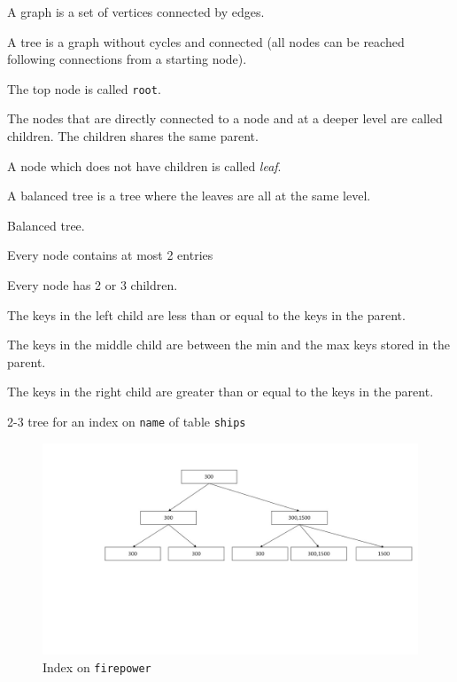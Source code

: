 \documentclass{beamer}
\begin{document}
\begin{slide}{
\item A graph is a set of vertices connected by edges.
\item A tree is a graph without cycles and connected (all nodes can be reached following connections from a starting node).
\item The top node is called \texttt{root}.
\item The nodes that are directly connected to a node and at a deeper level are called children. The children shares the same parent.
\item A node which does not have children is called \textit{leaf}.
\item A balanced tree is a tree where the leaves are all at the same level.
}\end{slide}

\begin{slide}{
\item Balanced tree.
\item Every node contains at most 2 entries
\item Every node has 2 or 3 children.
\item The keys in the left child are less than or equal to the keys in the parent.
\item The keys in the middle child are between the min and the max keys stored in the parent.
\item The keys in the right child are greater than or equal to the keys in the parent.
}\end{slide}

\begin{frame}{2-3 tree for an index on \texttt{name} of table \texttt{ships}}
\begin{figure}
\centering
\includegraphics[scale=0.3]{img/tree2}
\caption{Index on \texttt{firepower}}
\end{figure}
\end{frame}
\end{document}
